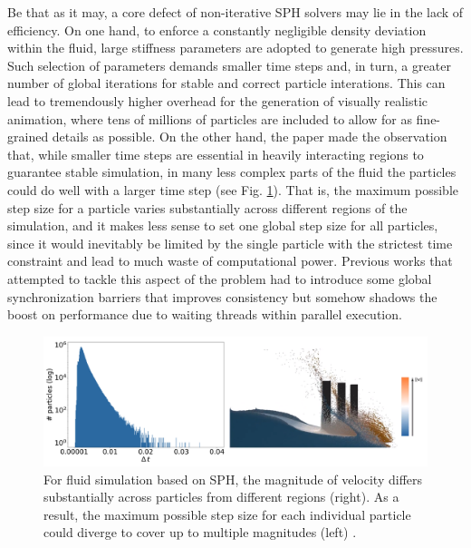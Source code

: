 \documentclass[
	11pt, 
	DIV10,
	ngerman,
	a4paper, 
	oneside, 
	headings=normal, 
	captions=tableheading,
	final, 
	numbers=noenddot
]{scrartcl}
\begin{document}
\par
Be that as it may, a core defect of non-iterative SPH solvers may lie in the lack of efficiency. On one hand, to enforce a constantly negligible density deviation within the fluid, large stiffness parameters are adopted to generate high pressures. Such selection of parameters demands smaller time steps and, in turn, a greater number of global iterations for stable and correct particle interations. This can lead to tremendously higher overhead for the generation of visually realistic animation, where tens of millions of particles are included to allow for as fine-grained details as possible. On the other hand, the paper made the observation that, while smaller time steps are essential in heavily interacting regions to guarantee stable simulation, in many less complex parts of the fluid the particles could do well with a larger time step (see Fig. \ref{fig2}). That is, the maximum possible step size for a particle varies substantially across different regions of the simulation, and it makes less sense to set one global step size for all particles, since it would inevitably be limited by the single particle with the strictest time constraint and lead to much waste of computational power. Previous works that attempted to tackle this aspect of the problem had to introduce some global synchronization barriers that improves consistency but somehow shadows the boost on performance due to waiting threads within parallel execution.

\begin{figure}[tb]
	\centering
	\includegraphics[scale=0.25]{images/1}
	\caption{\label{fig2} For fluid simulation based on SPH, the magnitude of velocity differs substantially across particles from different regions (right). As a result, the maximum possible step size for each individual particle could diverge to cover up to multiple magnitudes (left) \cite{reinhardt2017fully}.}
\end{figure}
\end{document}
